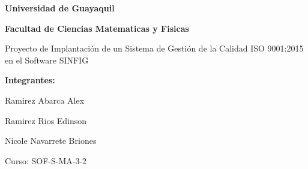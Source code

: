 \documentclass[10pt,a4paper]{article}
\begin{document}
\begin{center}
\textbf{Universidad de Guayaquil}

\textbf{Facultad de Ciencias Matematicas y Fisicas}

Proyecto de Implantación de un Sistema de Gestión de la Calidad ISO 9001:2015 en el Software SINFIG

\textbf{Integrantes:}

Ramirez Abarca Alex

Ramirez Rios Edinson 

Nicole Navarrete Briones

Curso: SOF-S-MA-3-2
\end{center}
\end{document}
